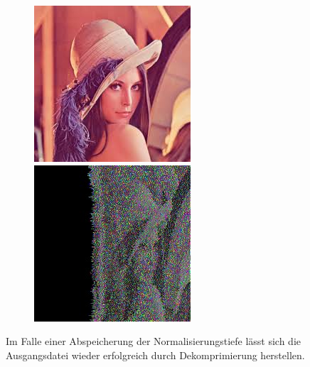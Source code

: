 \documentclass[a4paper,12pt]{article}
\begin{document}
\begin{figure}[h]
    \centering
\begin{minipage}[h]{.45\linewidth}
\centering
\includegraphics[width=0.55\linewidth]{preconditioning/lena}
\end{minipage}
\hfill
\begin{minipage}[h]{0.45\linewidth}
\centering
\includegraphics[width=0.55\linewidth]{preconditioning/lena_ON}
\end{minipage}
\end{figure}
\par
\vspace{1cm}
Im Falle einer Abspeicherung der Normalisierungstiefe lässt sich die Ausgangsdatei wieder erfolgreich durch Dekomprimierung herstellen.

\newpage
\end{document}
